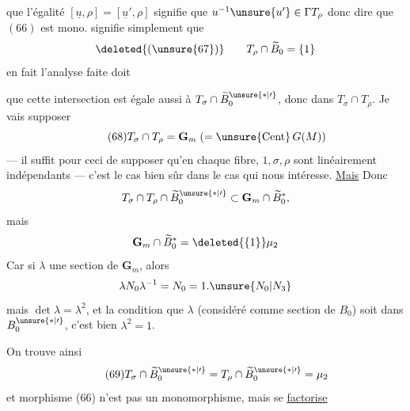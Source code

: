  que l'égalité $[\underline u,\rho]=[\underline u',\rho]$ signifie que $u^{-1}\unsure{u'}\in\Gamma T_\rho$ donc  dire que $(66)$ est mono. signifie simplement que
\[
\deleted{(\unsure{67})}\qquad T_\rho\cap\widetilde B_0=\{1\}
\]
en fait l'analyse faite doit 


que cette intersection est égale aussi à $T_\sigma\cap\widetilde B_0^{\unsure{*|\prime}}$, donc  dans $T_\sigma\cap T_\rho$. Je vais supposer
\[
\tag{68}
T_\sigma\cap T_\rho=\mathbf G_m\;(=\unsure{\mathrm{Cent}}\,G(M))
\]
--- il suffit pour ceci de supposer qu'en chaque fibre, $1,\sigma,\rho$ sont linéairement indépendants --- c'est le cas bien sûr dans le cas qui nous intéresse. \uline{Mais} Donc
\[
T_\sigma\cap T_\rho\cap\widetilde B_0^{\unsure{*|\prime}}\subset\mathbf G_m\cap\widetilde B_0^*,
\]
mais
\[
\mathbf G_m\cap\widetilde B_0^*=\deleted{\{1\}}\mu_2
\]
Car si $\lambda$  une section  de $\mathbf G_m$, alors
\[
\lambda N_0\lambda^{-1}=N_0=1.\unsure{N_0|N_3}
\]
mais $\det\lambda=\lambda^2$, et la condition que $\lambda$  (considéré comme section de $B_0$) soit dans $B_0^{\unsure{*|\prime}}$, c'est bien \uline{$\lambda^2=1$}. 

On trouve  ainsi
\[
\tag{69}
T_\sigma\cap\widetilde B_0^{\unsure{*|\prime}}=T_\rho\cap\widetilde B_0^{\unsure{*|\prime}}=\mu_2
\]
et  morphisme (66) n'est pas un monomorphisme, mais se \uline{factorise}


